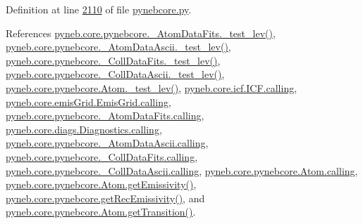 Definition at line \hyperlink{pynebcore_8py_source_l02110}{2110} of file \hyperlink{pynebcore_8py_source}{pynebcore.\+py}.



References \hyperlink{pynebcore_8py_source_l00171}{pyneb.\+core.\+pynebcore.\+\_\+\+Atom\+Data\+Fits.\+\_\+test\+\_\+lev()}, \hyperlink{pynebcore_8py_source_l00435}{pyneb.\+core.\+pynebcore.\+\_\+\+Atom\+Data\+Ascii.\+\_\+test\+\_\+lev()}, \hyperlink{pynebcore_8py_source_l00660}{pyneb.\+core.\+pynebcore.\+\_\+\+Coll\+Data\+Fits.\+\_\+test\+\_\+lev()}, \hyperlink{pynebcore_8py_source_l01026}{pyneb.\+core.\+pynebcore.\+\_\+\+Coll\+Data\+Ascii.\+\_\+test\+\_\+lev()}, \hyperlink{pynebcore_8py_source_l01459}{pyneb.\+core.\+pynebcore.\+Atom.\+\_\+test\+\_\+lev()}, \hyperlink{icf_8py_source_l00016}{pyneb.\+core.\+icf.\+I\+C\+F.\+calling}, \hyperlink{emis_grid_8py_source_l00041}{pyneb.\+core.\+emis\+Grid.\+Emis\+Grid.\+calling}, \hyperlink{pynebcore_8py_source_l00090}{pyneb.\+core.\+pynebcore.\+\_\+\+Atom\+Data\+Fits.\+calling}, \hyperlink{diags_8py_source_l00169}{pyneb.\+core.\+diags.\+Diagnostics.\+calling}, \hyperlink{pynebcore_8py_source_l00311}{pyneb.\+core.\+pynebcore.\+\_\+\+Atom\+Data\+Ascii.\+calling}, \hyperlink{pynebcore_8py_source_l00568}{pyneb.\+core.\+pynebcore.\+\_\+\+Coll\+Data\+Fits.\+calling}, \hyperlink{pynebcore_8py_source_l00918}{pyneb.\+core.\+pynebcore.\+\_\+\+Coll\+Data\+Ascii.\+calling}, \hyperlink{pynebcore_8py_source_l01175}{pyneb.\+core.\+pynebcore.\+Atom.\+calling}, \hyperlink{pynebcore_8py_source_l01716}{pyneb.\+core.\+pynebcore.\+Atom.\+get\+Emissivity()}, \hyperlink{pynebcore_8py_source_l03036}{pyneb.\+core.\+pynebcore.\+get\+Rec\+Emissivity()}, and \hyperlink{pynebcore_8py_source_l01406}{pyneb.\+core.\+pynebcore.\+Atom.\+get\+Transition()}.


